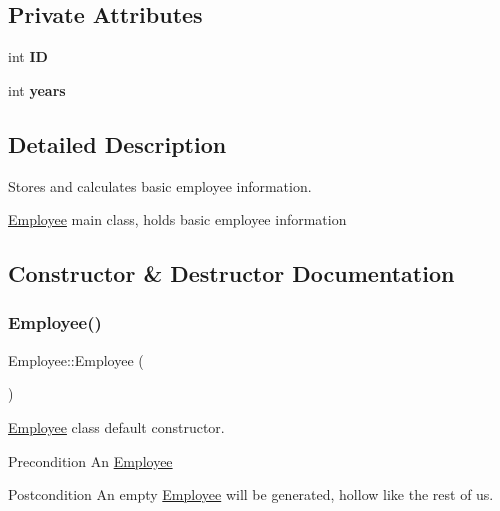 \subsection*{Private Attributes}
\begin{DoxyCompactItemize}
\item 
\mbox{\label{classEmployee_a832bbae4ee8a704b917f82c4d497bbac}} 
int {\bfseries ID}
\item 
\mbox{\label{classEmployee_a3e4862d9dfc73becb459a562fa2e25f5}} 
int {\bfseries years}
\end{DoxyCompactItemize}


\subsection{Detailed Description}
Stores and calculates basic employee information. 

\hyperlink{classEmployee}{Employee} main class, holds basic employee information 

\subsection{Constructor \& Destructor Documentation}
\mbox{\label{classEmployee_a003c7bd08c40924e381eb0750cbb906f}} 
\subsubsection{\texorpdfstring{Employee()}{Employee()}\hspace{0.1cm}{\footnotesize\ttfamily [1/2]}}
{\footnotesize\ttfamily Employee\+::\+Employee (\begin{DoxyParamCaption}{ }\end{DoxyParamCaption})}

\hyperlink{classEmployee}{Employee} class default constructor.

\begin{DoxyPrecond}{Precondition}
An \hyperlink{classEmployee}{Employee} 
\end{DoxyPrecond}
\begin{DoxyPostcond}{Postcondition}
An empty \hyperlink{classEmployee}{Employee} will be generated, hollow like the rest of us. 
\end{DoxyPostcond}
\mbox{\label{classEmployee_ad0c935ef9a290a82dcf7865172c90148}} 
